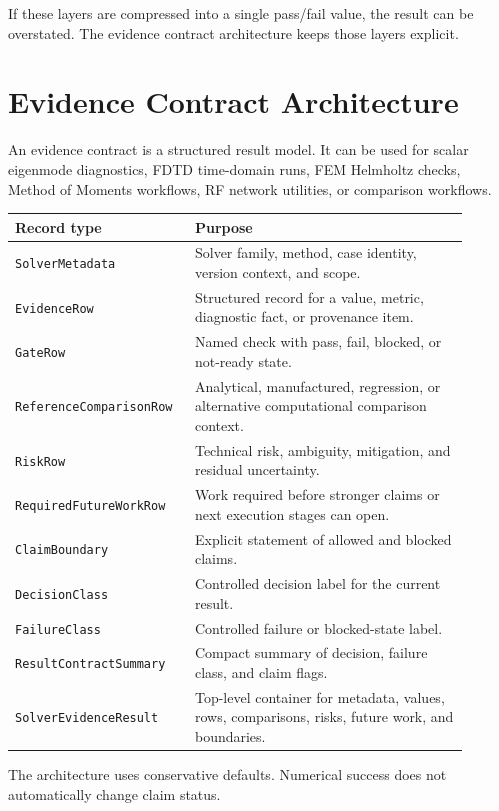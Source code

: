 \documentclass[11pt,a4paper]{article}
\newcommand{\code}[1]{\texttt{#1}}
\begin{document}
If these layers are compressed into a single pass/fail value, the result can be overstated. The evidence contract architecture keeps those layers explicit.

\section{Evidence Contract Architecture}
\label{sec:evidence-contract-architecture}

An evidence contract is a structured result model. It can be used for scalar eigenmode diagnostics, FDTD time-domain runs, FEM Helmholtz checks, Method of Moments workflows, RF network utilities, or comparison workflows.

\begin{longtable}{p{0.32\linewidth}p{0.58\linewidth}}
\toprule
\textbf{Record type} & \textbf{Purpose}\\
\midrule
\endhead
\code{SolverMetadata} & Solver family, method, case identity, version context, and scope.\\
\code{EvidenceRow} & Structured record for a value, metric, diagnostic fact, or provenance item.\\
\code{GateRow} & Named check with pass, fail, blocked, or not-ready state.\\
\code{ReferenceComparisonRow} & Analytical, manufactured, regression, or alternative computational comparison context.\\
\code{RiskRow} & Technical risk, ambiguity, mitigation, and residual uncertainty.\\
\code{RequiredFutureWorkRow} & Work required before stronger claims or next execution stages can open.\\
\code{ClaimBoundary} & Explicit statement of allowed and blocked claims.\\
\code{DecisionClass} & Controlled decision label for the current result.\\
\code{FailureClass} & Controlled failure or blocked-state label.\\
\code{ResultContractSummary} & Compact summary of decision, failure class, and claim flags.\\
\code{SolverEvidenceResult} & Top-level container for metadata, values, rows, comparisons, risks, future work, and boundaries.\\
\bottomrule
\end{longtable}

The architecture uses conservative defaults. Numerical success does not automatically change claim status.
\end{document}
